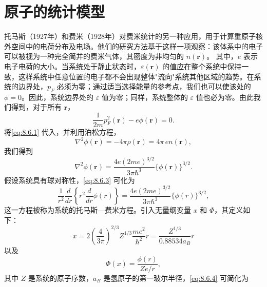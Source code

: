 \section{原子的统计模型}\label{ux539fux5b50ux7684ux7edfux8ba1ux6a21ux578b}
托马斯（1927年）和费米（1928年）对费米统计的另一种应用，用于计算重原子核外空间中的电荷分布及电场。他们的研究方法基于这样一项观察：该体系中的电子可以被视为一种完全简并的费米气体，其密度为非均匀的 \(n(\mathbf{r})\)。
其中，\(e\) 表示电子电荷的大小。当系统处于静止状态时，\(\varepsilon(\boldsymbol{r})\) 的值应在整个系统中保持一致，这样系统中任意位置的电子都不会出现整体"流向"系统其他区域的趋势。在系统的边界处，\(p_F\) 必须为零；通过适当选择能量的参考点，我们也可以使该处的 \(\phi = 0\)。因此，系统边界处的 \(\varepsilon\) 值为零；同样，系统整体的 \(\varepsilon\) 值也必为零。由此我们得到，对于所有 \(\boldsymbol{r}\)，
\begin{equation}\tag{8.6.1}\label{eq:8.6.1}
\frac { 1 } { 2 m } p _ { F } ^{2} ( \pmb { r } ) - e \phi ( \pmb { r } ) = 0 .
\end{equation}
将\autoref{eq:8.6.1} 代入，并利用泊松方程，
\begin{equation}\tag{8.6.2}\label{eq:8.6.2}
\nabla ^{2} \phi ( \pmb { r } ) = - 4 \pi \rho ( \pmb { r } ) = 4 \pi \, e n ( \pmb { r } ) ,
\end{equation}
我们得到
\begin{equation}\tag{8.6.3}\label{eq:8.6.3}
\nabla ^{2} \phi ( \pmb { r } ) = \frac { 4 e ( 2 m e ) ^{3 / 2} } { 3 \pi \hbar ^{3} } \{ \phi ( \pmb { r } ) \} ^{3 / 2} .
\end{equation}
假设系统具有球对称性，\autoref{eq:8.6.3} 可化为
\begin{equation}\tag{8.6.4}\label{eq:8.6.4}
\frac { 1 } { r ^{2} } \frac { d } { d r } \left\{ r ^{2} \frac { d } { d r } \phi ( r ) \right\} = \frac { 4 e ( 2 m e ) ^{3 / 2} } { 3 \pi \hbar ^{3} } \{ \phi ( r ) \} ^{3 / 2} ,
\end{equation}
这一方程被称为系统的托马斯---费米方程。引入无量纲变量 \(x\) 和 \(\Phi\)，其定义如下：
\begin{equation}\tag{8.6.5}\label{eq:8.6.5}
x = 2 \left( \frac { 4 } { 3 \pi } \right) ^{2 / 3} Z ^{1 / 3} \frac { m e ^{2} } { \hbar ^{2} } r = \frac { Z ^{1 / 3} } { 0 . 88 53 4 a _ { B } } r
\end{equation}
以及
\begin{equation}\tag{8.6.6}\label{eq:8.6.6}
\Phi ( x ) = \frac { \phi ( r ) } { Z e / r } ,
\end{equation}
其中 \(Z\) 是系统的原子序数，\(a_{B}\) 是氢原子的第一玻尔半径，\autoref{eq:8.6.4} 可简化为
